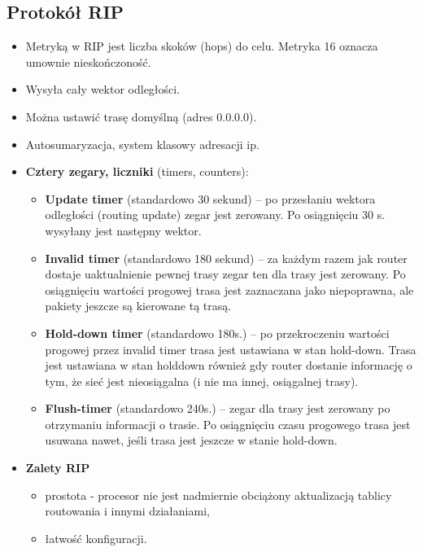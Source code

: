 \documentclass[../main.tex]{subfiles}
\begin{document}
    \subsection{Protokół RIP}
    \begin{itemize}
        \item Metryką w RIP jest liczba skoków (hops) do celu. Metryka 16 oznacza umownie nieskończoność.
        \item Wysyła cały wektor odległości.

        \item Można ustawić trasę domyślną (adres 0.0.0.0).

        \item Autosumaryzacja, system klasowy adresacji ip.

        \item \textbf{Cztery zegary, liczniki} (timers, counters):
        \begin{itemize}
            \item \textbf{Update timer} (standardowo 30 sekund) – po przesłaniu wektora odległości
            (routing update) zegar jest zerowany. Po osiągnięciu 30 s. wysyłany jest następny wektor.
            \item \textbf{Invalid timer} (standardowo 180 sekund) – za każdym razem jak router dostaje uaktualnienie pewnej trasy zegar ten dla trasy jest zerowany. Po osiągnięciu wartości progowej trasa jest zaznaczana jako niepoprawna, ale pakiety jeszcze są kierowane tą trasą.
            \item \textbf{Hold-down timer} (standardowo 180s.) – po przekroczeniu wartości progowej
            przez invalid timer trasa jest ustawiana w stan hold-down. Trasa jest ustawiana w stan holddown również gdy router dostanie informację o tym, że sieć jest nieosiągalna (i nie ma innej, osiągalnej trasy).
            \item \textbf{Flush-timer} (standardowo 240s.) – zegar dla trasy jest zerowany po otrzymaniu informacji o trasie. Po osiągnięciu czasu progowego trasa jest usuwana nawet, jeśli trasa jest jeszcze w stanie hold-down.
        \end{itemize}

        \item \textbf{Zalety RIP}
        \begin{itemize}
            \item prostota - procesor nie jest nadmiernie obciążony aktualizacją tablicy routowania i innymi działaniami,
            \item łatwość konfiguracji.
        \end{itemize}


\end{itemize}
\end{document}
